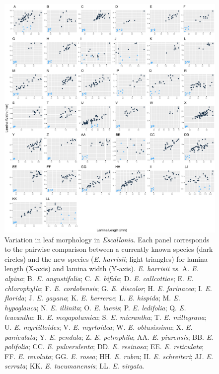 \documentclass[fleqn,10pt,lineno]{wlpeerj} %
\begin{document}
\begin{figure}[ht]
\centering
\includegraphics[width=\linewidth]{Figure1}
\caption{Variation in leaf morphology in \emph{Escallonia}. Each panel corresponds to the pairwise comparison between a currently known species (dark circles) and the new species (\emph{E. harrisii}; light triangles) for lamina length (X-axis) and lamina width (Y-axis). \emph{E. harrisii} \emph{vs.} A. \emph{E. alpina}; B. \emph{E. angustifolia}; C. \emph{E. bifida}; D. \emph{E. callcottiae}; E. \emph{E. chlorophylla}; F. \emph{E. cordobensis}; G. \emph{E. discolor}; H. \emph{E. farinacea}; I. \emph{E. florida}; J. \emph{E. gayana}; K. \emph{E. herrerae}; L. \emph{E. hispida}; M. \emph{E. hypoglauca}; N. \emph{E. illinita}; O. \emph{E. laevis}; P. \emph{E. ledifolia}; Q. \emph{E. leucantha}; R. \emph{E. megapotamica}; S. \emph{E. micrantha}; T. \emph{E. millegrana}; U. \emph{E. myrtilloides}; V. \emph{E. myrtoidea}; W. \emph{E. obtusissima}; X. \emph{E. paniculata}; Y. \emph{E. pendula}; Z. \emph{E. petrophila}; AA. \emph{E. piurensis}; BB. \emph{E. polifolia}; CC. \emph{E. pulverulenta}; DD. \emph{E. resinosa}; EE. \emph{E. reticulata}; FF. \emph{E. revoluta}; GG. \emph{E. rosea}; HH. \emph{E. rubra}; II. \emph{E. schreiteri}; JJ. \emph{E. serrata};  KK. \emph{E. tucumanensis}; LL. \emph{E. virgata}.}
\label{fig:Figure1}
\end{figure}
\end{document}

